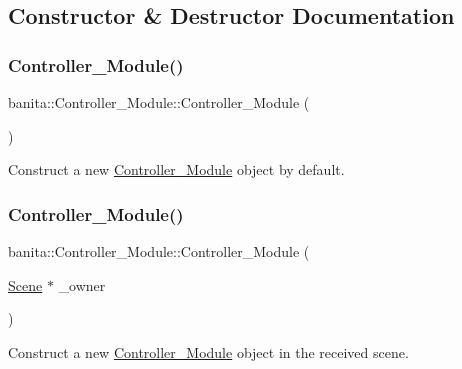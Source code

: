 \subsection{Constructor \& Destructor Documentation}
\mbox{\label{classbanita_1_1_controller___module_a0da114014e41487299db20b99ec15ebe}} 
\subsubsection{\texorpdfstring{Controller\_Module()}{Controller\_Module()}\hspace{0.1cm}{\footnotesize\ttfamily [1/2]}}
{\footnotesize\ttfamily banita\+::\+Controller\+\_\+\+Module\+::\+Controller\+\_\+\+Module (\begin{DoxyParamCaption}{ }\end{DoxyParamCaption})}



Construct a new \mbox{\hyperlink{classbanita_1_1_controller___module}{Controller\+\_\+\+Module}} object by default. 

\mbox{\label{classbanita_1_1_controller___module_acb21ceec082c7ebd025bedaab1cc7c8e}} 
\subsubsection{\texorpdfstring{Controller\_Module()}{Controller\_Module()}\hspace{0.1cm}{\footnotesize\ttfamily [2/2]}}
{\footnotesize\ttfamily banita\+::\+Controller\+\_\+\+Module\+::\+Controller\+\_\+\+Module (\begin{DoxyParamCaption}\item[{\mbox{\hyperlink{classbanita_1_1_scene}{Scene}} $\ast$}]{\+\_\+owner }\end{DoxyParamCaption})}



Construct a new \mbox{\hyperlink{classbanita_1_1_controller___module}{Controller\+\_\+\+Module}} object in the received scene. 


